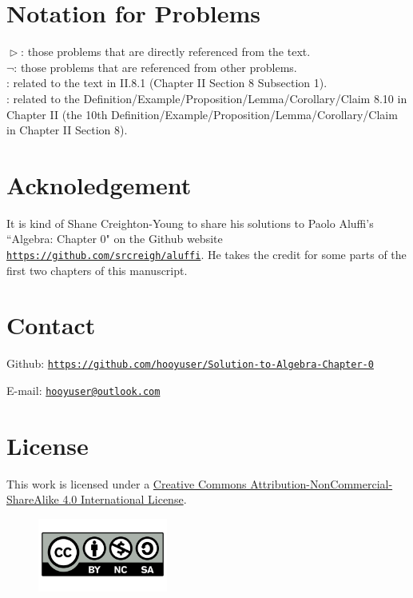 \documentclass[12pt,letterpaper,boxed]{hmcpset}
\renewcommand\appendix{\setcounter{secnumdepth}{-2}}
\begin{document}
		

\tableofcontents
\appendix

\newpage
\section*{Notation for Problems}
$\vartriangleright$: those problems that are directly referenced from the text.\\

\noindent $\neg$: those problems that are referenced from other
problems.\\

\noindent [\textsection II.8.1]: related to the text in  II.8.1 (Chapter II Section 8 Subsection 1).\\

\noindent [II.8.10]: related to the Definition/Example/Proposition/Lemma/Corollary/Claim 8.10 in Chapter II (the 10th Definition/Example/Proposition/Lemma/Corollary/Claim in Chapter II Section 8).

\section*{Acknoledgement}
It is kind of Shane Creighton-Young to share his solutions to Paolo Aluffi's ``Algebra: Chapter 0"\cite{aluffi2009algebra} on the Github website \href{https://github.com/srcreigh/aluffi}{\texttt{https://github.com/srcreigh/aluffi}}. He takes the credit for some parts of the first two chapters of this manuscript. 

\section*{Contact}
Github:
\href{https://github.com/hooyuser/Solution-to-Algebra-Chapter-0}{\texttt{https://github.com/hooyuser/Solution-to-Algebra-Chapter-0}} 

\noindent E-mail: \href{mailto:hooyuser@outlook.com}{\texttt{hooyuser@outlook.com}}


\section*{License}
This work is licensed under a \href{http://creativecommons.org/licenses/by-nc-sa/4.0/}{Creative Commons Attribution-NonCommercial-ShareAlike 4.0 International License}.
\vfill
\begin{figure}[h]
	\centering\includegraphics[width=0.38\textwidth]{./BY-NC-SA}
\end{figure}
\end{document}
